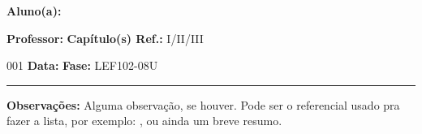\noindent \textbf{Aluno(a):} \imprimirautor
\par\noindent \textbf{Professor:} \imprimirorientador\hfill{}\textbf{Capítulo(s) Ref.:} I/II/III  
\par\noindent \textbf{\imprimirtipotrabalho} 001  \hfill{}\textbf{Data:} \imprimirdata\hfill{}\textbf{Fase:} LEF102-08U
\rule{\textwidth}{.5pt}
\bigskip{}
\begin{center}
	\ABNTEXchapterfont\Large\MakeUppercase{\imprimirtitulo}
\end{center}

\noindent \textbf{Observações:} Alguma observação, se houver. Pode ser o referencial usado pra fazer a lista, por exemplo: \cite{GREINER:2004,SALINAS:2001}, ou ainda um breve resumo.